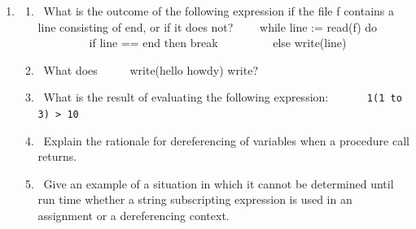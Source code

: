 \liststyleLi
\begin{enumerate}
\item \begin{enumerate}
\item 
\ What is the outcome of the following expression if the file f contains a line consisting of
{\textquotedbl}end{\textquotedbl}, or if it does not?\newline
 \ \ \ \ while line := read(f) do\newline
 \ \ \ \ \ \ \ \ \ if line == {\textquotedbl}end{\textquotedbl} then break\newline
 \ \ \ \ \ \ \ \ \ else write(line)
\item 
\ What does\newline
 \ \ \ \ \ write({\textquotedbl}hello{\textquotedbl} {\textbar} {\textquotedbl}howdy{\textquotedbl})\newline
write?
\item 
\ What is the result of evaluating the following expression:\newline
\texttt{ \ \ \ \ \ 1(1 to 3) {\textgreater} 10}
\item 
\ Explain the rationale for dereferencing of variables when a procedure call returns.
\item 
\ Give an example of a situation in which it cannot be determined until run time whether a string subscripting
expression is used in an assignment or a dereferencing context.
\end{enumerate}
\end{enumerate}
